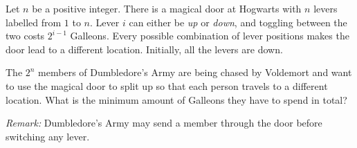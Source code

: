 Let $n$ be a positive integer.
There is a magical door at Hogwarts with $n$ levers labelled from $1$ to $n$.
Lever $i$ can either be \emph{up} or \emph{down},
and toggling between the two costs $2^{i-1}$ Galleons.
Every possible combination of lever positions makes the door lead to a different location.
Initially, all the levers are down.

The $2^{n}$ members of Dumbledore's Army are being chased by Voldemort and
want to use the magical door to split up so that each person travels to a different location.
What is the minimum amount of Galleons they have to spend in total?

\emph{Remark:} Dumbledore's Army may send a member through the door before switching any lever.
